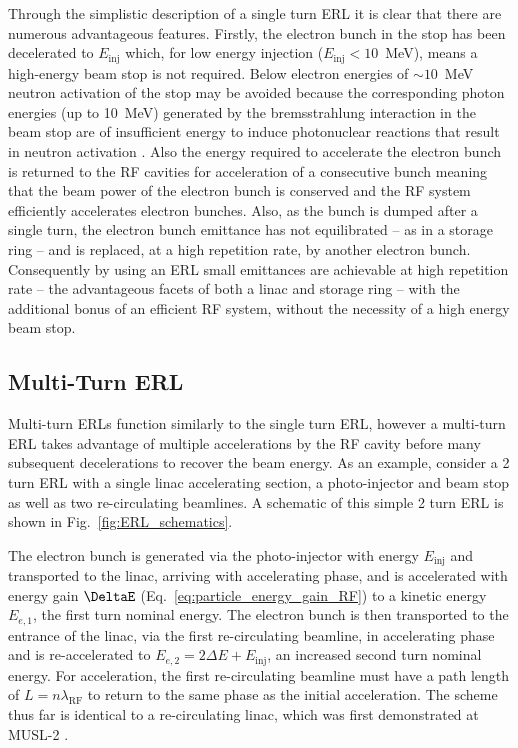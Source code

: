 \documentclass[../main.tex]{subfiles}
\begin{document}
Through the simplistic description of a single turn ERL it is clear that there are numerous advantageous features. Firstly, the electron bunch in the stop has been decelerated to $E_{\mathrm{inj}}$ which, for low energy injection ($E_{\mathrm{inj}}<10$~\si{\mega\electronvolt}), means a high-energy beam stop is not required. Below electron energies of $\sim10$~\si{\mega\electronvolt} neutron activation of the stop may be avoided because the corresponding photon energies (up to 10~\si{\mega\electronvolt}) generated by the bremsstrahlung interaction in the beam stop are of insufficient energy to induce photonuclear reactions that result in neutron activation \cite{ahlgren1988induced}. Also the energy required to accelerate the electron bunch is returned to the RF cavities for acceleration of a consecutive bunch meaning that the beam power of the electron bunch is conserved and the RF system efficiently accelerates electron bunches. Also, as the bunch is dumped after a single turn, the electron bunch emittance  has not equilibrated -- as in a storage ring \cite{owen2013nonequilibrium} -- and is replaced, at a high repetition rate, by another electron bunch. Consequently by using an ERL small emittances are achievable at high repetition rate -- the advantageous facets of both a linac and storage ring -- with the additional bonus of an efficient RF system, without the necessity of a high energy beam stop. 

\subsection{Multi-Turn ERL}
\label{sec:multi_turn_ERL}

Multi-turn ERLs function similarly to the single turn ERL, however a multi-turn ERL takes advantage of multiple accelerations by the RF cavity before many subsequent decelerations to recover the beam energy. As an example, consider a 2 turn ERL with a single linac accelerating section, a photo-injector and beam stop as well as two re-circulating beamlines. A schematic of this simple 2 turn ERL is shown in Fig.~\ref{fig:ERL_schematics}.

The electron bunch is generated via the photo-injector with energy $E_{\mathrm{inj}}$ and transported to the linac, arriving with accelerating phase, and is accelerated with energy gain $\DeltaE$ (Eq.~\ref{eq:particle_energy_gain_RF}) to a kinetic energy $E_{e,1}$, the first turn nominal energy. The electron bunch is then transported to the entrance of the linac, via the first re-circulating beamline, in accelerating phase and is re-accelerated to $E_{e,2}=2\Delta E+E_{\mathrm{inj}}$, an increased second turn nominal energy. For acceleration, the first re-circulating beamline must have a path length of $L = n\lambda_{\mathrm{RF}}$ to return to the same phase as the initial acceleration. The scheme thus far is identical to a re-circulating linac, which was first demonstrated at MUSL-2 \cite{axel1977status}.
\end{document}
